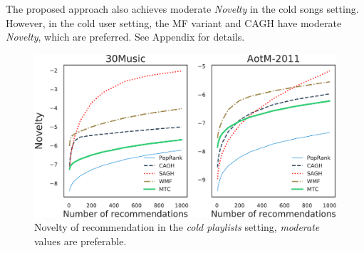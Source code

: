 The proposed approach also achieves moderate \emph{Novelty} in the cold songs setting.
However, in the cold user setting, the MF variant and CAGH have moderate \emph{Novelty},
which are preferred. See Appendix for details.


%



\begin{figure}[!t]
    \centering
    \includegraphics[width=\columnwidth]{fig/nov3.pdf}
    \caption{Novelty of recommendation in the \emph{cold playlists} setting,
\emph{moderate} values are preferable.}
    \label{fig:nov3}
\end{figure}


